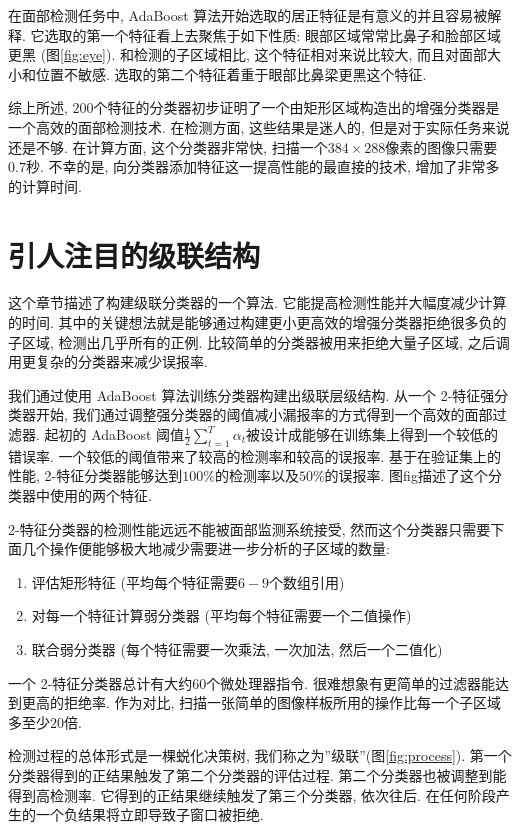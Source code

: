 \documentclass[a4paper,utf8,11pt, onecolumn]{ctexart}
\begin{document}
在面部检测任务中, AdaBoost 算法开始选取的居正特征是有意义的并且容易被解释. 它选取的第一个特征看上去聚焦于如下性质: 眼部区域常常比鼻子和脸部区域更黑 (图\ref{fig:eye}). 和检测的子区域相比, 这个特征相对来说比较大, 而且对面部大小和位置不敏感. 选取的第二个特征着重于眼部比鼻梁更黑这个特征.

综上所述, $200$个特征的分类器初步证明了一个由矩形区域构造出的增强分类器是一个高效的面部检测技术. 在检测方面, 这些结果是迷人的, 但是对于实际任务来说还是不够. 在计算方面, 这个分类器非常快, 扫描一个$384\times288$像素的图像只需要$0.7$秒. 不幸的是, 向分类器添加特征这一提高性能的最直接的技术, 增加了非常多的计算时间.

\section{引人注目的级联结构}\label{sec:cascade}
这个章节描述了构建级联分类器的一个算法. 它能提高检测性能并大幅度减少计算的时间. 其中的关键想法就是能够通过构建更小更高效的增强分类器拒绝很多负的子区域, 检测出几乎所有的正例. 比较简单的分类器被用来拒绝大量子区域, 之后调用更复杂的分类器来减少误报率.

我们通过使用 AdaBoost 算法训练分类器构建出级联层级结构. 从一个 2-特征强分类器开始, 我们通过调整强分类器的阈值减小漏报率的方式得到一个高效的面部过滤器. 起初的 AdaBoost 阈值$\frac12\sum_{t=1}^T\alpha_t$被设计成能够在训练集上得到一个较低的错误率. 一个较低的阈值带来了较高的检测率和较高的误报率. 基于在验证集上的性能, 2-特征分类器能够达到$100\%$的检测率以及$50\%$的误报率. 图fig描述了这个分类器中使用的两个特征.

2-特征分类器的检测性能远远不能被面部监测系统接受, 然而这个分类器只需要下面几个操作便能够极大地减少需要进一步分析的子区域的数量:
\begin{enumerate}
\item 评估矩形特征 (平均每个特征需要$6-9$个数组引用)
\item 对每一个特征计算弱分类器 (平均每个特征需要一个二值操作)
\item 联合弱分类器 (每个特征需要一次乘法, 一次加法, 然后一个二值化)
\end{enumerate}

一个 2-特征分类器总计有大约$60$个微处理器指令. 很难想象有更简单的过滤器能达到更高的拒绝率. 作为对比, 扫描一张简单的图像样板所用的操作比每一个子区域多至少$20$倍.

检测过程的总体形式是一棵蜕化决策树, 我们称之为''级联''\citep{quinlan1986induction}(图\ref{fig:process}). 第一个分类器得到的正结果触发了第二个分类器的评估过程. 第二个分类器也被调整到能得到高检测率. 它得到的正结果继续触发了第三个分类器, 依次往后. 在任何阶段产生的一个负结果将立即导致子窗口被拒绝.
\end{document}
